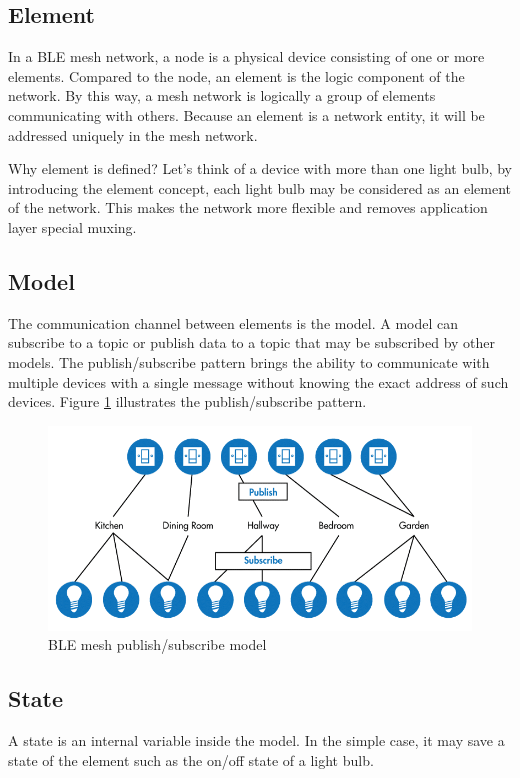 \documentclass[../../main.tex]{subfiles}
\begin{document}
\subsection{Element}
In a BLE mesh network, a node is a physical device consisting of one or more elements. Compared to the node, an element is the logic component of the network. By this way, a mesh network is logically a group of elements communicating with others. Because an element is a network entity, it will be addressed uniquely in the mesh network.

Why element is defined? Let's think of a device with more than one light bulb, by introducing the element concept, each light bulb may be considered as an element of the network. This makes the network more flexible and removes application layer special muxing.

\subsection{Model}
The communication channel between elements is the model. A model can subscribe to a topic or publish data to a topic that may be subscribed by other models. The publish/subscribe pattern brings the ability to  communicate with multiple devices with a single message without knowing the exact address of such devices. Figure \ref{fig:BLE mesh publish/subscribe model} illustrates the publish/subscribe pattern. 

\begin{figure}[ht]
    \begin{center}
        \includegraphics[scale=0.5]{ble_mesh_pub_sub.png}
    \end{center}
    \caption{BLE mesh publish/subscribe model}
    \label{fig:BLE mesh publish/subscribe model}
\end{figure}

\subsection{State}
A state is an internal variable inside the model. In the simple case, it may save a state of the element such as the on/off state of a light bulb.
\end{document}
